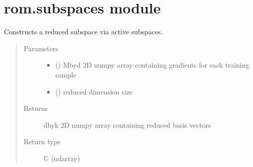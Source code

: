\documentclass[letterpaper,10pt,english]{sphinxmanual}
\begin{document}
\section{rom.subspaces module}
\label{\detokenize{rom:module-rom.subspaces}}\label{\detokenize{rom:rom-subspaces-module}}

\begin{fulllineitems}
\label{\detokenize{rom:rom.subspaces.AS}}
\sphinxAtStartPar
Constructs a reduced subspace via active subspaces.
\begin{quote}\begin{description}
\item[{Parameters}] \leavevmode\begin{itemize}
\item {} 
\sphinxAtStartPar
{} () \textendash{} M\sphinxhyphen{}by\sphinxhyphen{}d 2D numpy array containing gradients for each training sample

\item {} 
\sphinxAtStartPar
{} () \textendash{} reduced dimension size

\end{itemize}

\item[{Returns}] \leavevmode
\sphinxAtStartPar
d\sphinxhyphen{}by\sphinxhyphen{}k 2D numpy array containing reduced basis vectors

\item[{Return type}] \leavevmode
\sphinxAtStartPar
U (ndarray)

\end{description}\end{quote}

\end{fulllineitems}

\end{document}
